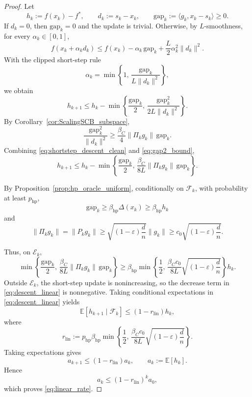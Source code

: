 \documentclass{article}
\begin{document}
\begin{proof}
Let
\[
h_k:=f(x_k)-f^*,
\qquad
d_k:=s_k-x_k,
\qquad
\mathrm{gap}_k:=\langle g_k,x_k-s_k\rangle\ge0.
\]
If \(d_k=0\), then \(\mathrm{gap}_k=0\) and the update is trivial. Otherwise,
by \(L\)-smoothness, for every \(\alpha_k\in[0,1]\),
\[
f(x_k+\alpha_kd_k)
\le
f(x_k)
-\alpha_k\,\mathrm{gap}_k
+
\frac{L}{2}\alpha_k^2\|d_k\|^2.
\]
With the clipped short-step rule
\[
\alpha_k
=
\min\!\left\{
1,\,
\frac{\mathrm{gap}_k}{L\|d_k\|^2}
\right\},
\]
we obtain
\begin{equation}
h_{k+1}
\le
h_k
-
\min\!\left\{
\frac{\mathrm{gap}_k}{2},\,
\frac{\mathrm{gap}_k^2}{2L\|d_k\|^2}
\right\}.
\label{eq:shortstep_descent_clean}
\end{equation}
By Corollary~\ref{cor:ScalingSCB_subspace},
\begin{equation}
\frac{\mathrm{gap}_k^2}{\|d_k\|^2}
\ge
\frac{\beta_C}{4}\|\Pi_k g_k\|\,\mathrm{gap}_k.
\label{eq:gap2_bound}
\end{equation}
Combining \eqref{eq:shortstep_descent_clean} and \eqref{eq:gap2_bound},
\begin{equation}
h_{k+1}
\le
h_k
-
\min\!\left\{
\frac{\mathrm{gap}_k}{2},\,
\frac{\beta_C}{8L}\|\Pi_k g_k\|\,\mathrm{gap}_k
\right\}.
\label{eq:descent_linear}
\end{equation}

By Proposition~\ref{prop:hp_oracle_uniform}, conditionally on
\(\mathcal F_k\), with probability at least \(p_{\mathrm{hp}}\),
\[
\mathrm{gap}_k\ge \beta_{\mathrm{hp}}\Delta(x_k)\ge \beta_{\mathrm{hp}}h_k
\]
and
\[
\|\Pi_k g_k\|=\|P_kg_k\|
\ge
\sqrt{(1-\varepsilon)\frac dn}\|g_k\|
\ge
c_0\sqrt{(1-\varepsilon)\frac dn}.
\]


Thus, on \(\mathcal E_k\),
\[
\min\!\left\{
\frac{\mathrm{gap}_k}{2},\,
\frac{\beta_C}{8L}\|\Pi_k g_k\|\,\mathrm{gap}_k
\right\}
\ge
\beta_{\mathrm{hp}}
\min\!\left\{
\frac12,\,
\frac{\beta_C c_0}{8L}
\sqrt{(1-\varepsilon)\frac dn}
\right\}h_k.
\]
Outside \(\mathcal E_k\), the short-step update is nonincreasing, so the
decrease term in \eqref{eq:descent_linear} is nonnegative.
Taking conditional expectations in \eqref{eq:descent_linear} yields
\begin{equation}
\mathbb E[h_{k+1}\mid\mathcal F_k]
\le
(1-r_{\mathrm{lin}})h_k,
\label{eq:linear_conditional_contraction}
\end{equation}
where
\begin{equation}
r_{\mathrm{lin}}
:=
p_{\mathrm{hp}}\beta_{\mathrm{hp}}
\min\!\left\{
\frac12,\,
\frac{\beta_C c_0}{8L}
\sqrt{(1-\varepsilon)\frac dn}
\right\}.
\label{eq:linear_rate_constant}
\end{equation}
Taking expectations gives
\[
a_{k+1}\le (1-r_{\mathrm{lin}})a_k,
\qquad
a_k:=\mathbb E[h_k].
\]
Hence
\[
a_k\le (1-r_{\mathrm{lin}})^ka_0,
\]
which proves \eqref{eq:linear_rate}.
\end{proof}
\end{document}

